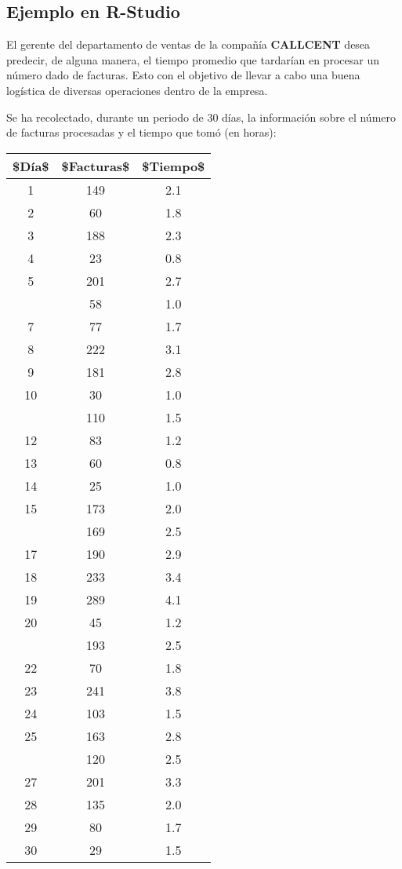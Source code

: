 \documentclass[
  a4paper,
  oneside,
  openany]{book}
\begin{document}
\hypertarget{ejemplo-en-r-studio-18}{%
\subsection{Ejemplo en R-Studio}\label{ejemplo-en-r-studio-18}}

El gerente del departamento de ventas de la compañía \textbf{CALLCENT} desea predecir, de alguna manera, el tiempo promedio que tardarían en procesar un número dado de facturas. Esto con el objetivo de llevar a cabo una buena logística de diversas operaciones dentro de la empresa.

Se ha recolectado, durante un periodo de 30 días, la información sobre el número de facturas procesadas y el tiempo que tomó (en horas):

\begin{table}
\centering
\begin{tabular}{ccc}
\toprule
\$Día\$ & \$Facturas\$ & \$Tiempo\$\\
\midrule
1 & 149 & 2.1\\
2 & 60 & 1.8\\
3 & 188 & 2.3\\
4 & 23 & 0.8\\
5 & 201 & 2.7\\
\addlinespace
6 & 58 & 1.0\\
7 & 77 & 1.7\\
8 & 222 & 3.1\\
9 & 181 & 2.8\\
10 & 30 & 1.0\\
\addlinespace
11 & 110 & 1.5\\
12 & 83 & 1.2\\
13 & 60 & 0.8\\
14 & 25 & 1.0\\
15 & 173 & 2.0\\
\addlinespace
16 & 169 & 2.5\\
17 & 190 & 2.9\\
18 & 233 & 3.4\\
19 & 289 & 4.1\\
20 & 45 & 1.2\\
\addlinespace
21 & 193 & 2.5\\
22 & 70 & 1.8\\
23 & 241 & 3.8\\
24 & 103 & 1.5\\
25 & 163 & 2.8\\
\addlinespace
26 & 120 & 2.5\\
27 & 201 & 3.3\\
28 & 135 & 2.0\\
29 & 80 & 1.7\\
30 & 29 & 1.5\\
\bottomrule
\end{tabular}
\end{table}
\end{document}
